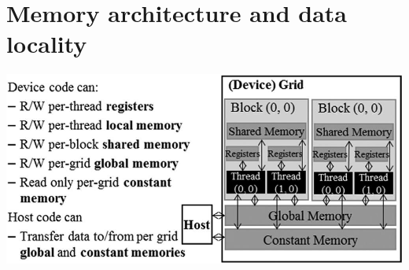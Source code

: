 \chapter{Memory architecture and data locality}
\begin{center}
    \includegraphics[width=0.8\linewidth]{Images/Memories/memory_types.png}
\end{center}
